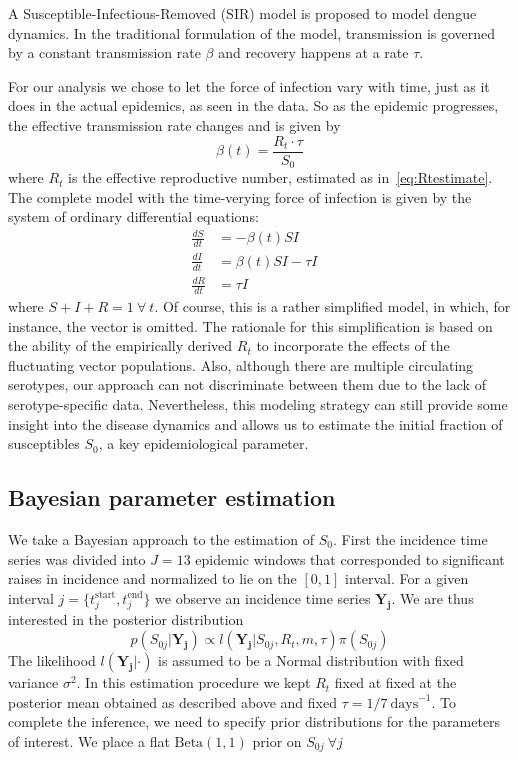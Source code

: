 A Susceptible-Infectious-Removed (SIR) model is proposed to model dengue 
dynamics.
In the traditional formulation of the model, transmission is governed by a 
constant transmission rate $\beta$ and recovery happens at a rate $\tau$.

For our analysis we chose to let the force of infection vary with time, just 
as it does in the actual epidemics, as seen in the data. So as the epidemic 
progresses, the effective transmission  rate changes and is 
given by 
\begin{equation} 
 \label{eq:effbeta}
 \beta(t) = \frac{R_t\cdot\tau}{S_0}
\end{equation}
where $R_t$ is the effective reproductive number, estimated as 
in~\ref{eq:Rtestimate}.
The complete model with the time-verying force of infection is given by
the system of ordinary differential equations:
\begin{align}
   \label{eq:model}
 \frac{dS}{dt} &= -\beta(t)SI \\     \nonumber
 \frac{dI}{dt} &= \beta(t)SI - \tau I&\\      \nonumber
 \frac{dR}{dt} &= \tau I&
\end{align}  
where $S + I + R = 1 \: \forall\: t$. %
Of course, this is a rather simplified model, in which, for instance, the 
vector is omitted.
The rationale for this simplification is based on the ability of the 
empirically derived $R_t$  to incorporate the effects of the fluctuating vector 
populations.
Also, although there are multiple circulating serotypes, our approach
can not discriminate between them due to the lack of serotype-specific data.
Nevertheless, this modeling strategy can still provide some insight into the 
disease dynamics and allows us to estimate the initial fraction of susceptibles 
$S_0$, a key epidemiological parameter.

\subsection*{Bayesian parameter estimation}
We take a Bayesian approach to the estimation of $S_0$.
First the incidence time series was divided into $J=13$ 
epidemic windows that corresponded to significant raises in incidence and 
normalized to lie on the $[0,1]$ interval.
For a given interval $j = \{ t_j^{\text{start}}, t_j^{\text{end}} \} $ we 
observe an incidence time series $\mathbf{Y_{j}}$.
We are thus interested in the posterior distribution
\begin{equation}
 \label{eq:S0post}
 p(S_{0j}|\mathbf{Y_{j}}) \propto l(\mathbf{Y_{j}}|S_{0j}, R_t, m, \tau 
)\pi(S_{0j}) 
\end{equation}
The likelihood $l(\mathbf{Y_{j}}|\cdot)$ is assumed to be a Normal distribution 
with fixed variance $\sigma^2$.
In this estimation procedure we kept $R_t$ fixed at fixed at the posterior mean 
obtained as described above and fixed $\tau = 1/7\: \text{days}^{-1}$.
To complete the inference, we need to specify prior distributions for the 
parameters of interest.
We place a flat $\text{Beta}(1, 1)$ prior on $S_{0j}\:\forall j$

